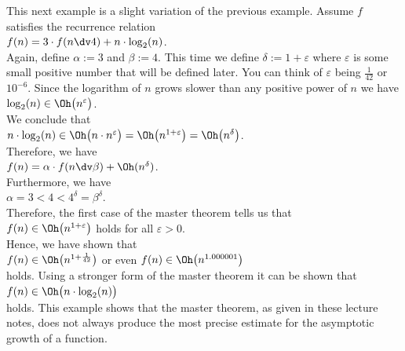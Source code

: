 \example
This next example is a slight variation of the previous example.  Assume $f$ satisfies the recurrence relation 
\\[0.2cm]
\hspace*{1.3cm}
$f(n) = 3 \cdot f(n \dv 4) + n \cdot \log_2(n)$.
\\[0.2cm]
Again, define $\alpha := 3$ and $\beta := 4$.  This time we define $\delta := 1 + \varepsilon$ where
$\varepsilon$ is some small positive number that will be defined later.  You can think of $\varepsilon$ being 
 $\frac{1}{42}$ or $10^{-6}$.  Since the logarithm of $n$ grows slower than any positive power of $n$ we have
\\[0.2cm]
\hspace*{1.3cm}
$\log_2(n) \in \Oh\bigl(n^\varepsilon\bigr)$.
\\[0.2cm]
We conclude that
\\[0.2cm]
\hspace*{1.3cm}
$n \cdot \log_2(n) \in \Oh\bigl(n \cdot n^\varepsilon\bigr) = \Oh\bigl(n^{1+\varepsilon}\bigr) = \Oh\bigl(n^\delta\bigr)$.
\\[0.2cm]
Therefore, we have
\\[0.2cm]
\hspace*{1.3cm}
$f(n) = \alpha \cdot f(n \dv \beta) + \Oh(n^\delta)$.
\\[0.2cm]
Furthermore, we have
\\[0.2cm]
\hspace*{1.3cm}
$\alpha = 3 < 4 < 4^\delta = \beta^\delta$.
\\[0.2cm]
Therefore, the first case of the master theorem tells us that
\\[0.2cm]
\hspace*{1.3cm}
$f(n) \in \Oh\bigl(n^{1+\varepsilon}\bigr)$ \quad holds for all $\varepsilon > 0$.
\\[0.2cm]
Hence, we have shown that
\\[0.2cm]
\hspace*{1.3cm}
$f(n) \in \Oh\bigl(n^{1+\frac{1}{42}}\bigr)$ \quad or even \quad $f(n) \in \Oh\bigl(n^{1.000001}\bigr)$
\\[0.2cm]
holds.  Using a stronger form of the master theorem it can be shown that
\\[0.2cm]
\hspace*{1.3cm}
$f(n) \in \Oh\bigl(n \cdot \log_2(n)\bigr)$
\\[0.2cm]
holds.  This example shows that the master theorem, as given in these lecture notes, does not always
produce the most precise estimate for the asymptotic growth of a function.

